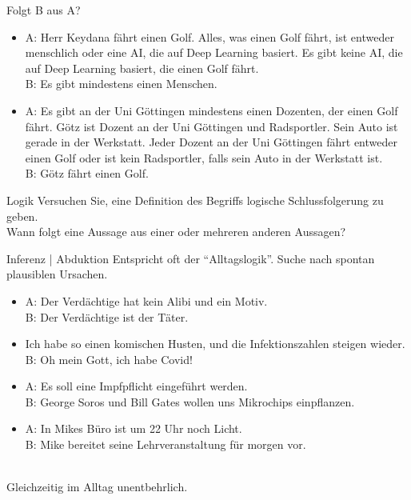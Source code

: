 \begin{frame}
  {Folgt B aus A?} %
  \onslide<+->
  \begin{itemize}[<+->]
    \item A: Herr Keydana fährt einen Golf. Alles, was einen Golf fährt, ist entweder menschlich oder eine AI, die auf Deep Learning basiert. Es gibt keine AI, die auf Deep Learning basiert, die einen Golf fährt.\\
      \alert{B: Es gibt mindestens einen Menschen.}
      \Halbzeile
    \item A: Es gibt an der Uni Göttingen mindestens einen Dozenten, der einen Golf fährt. Götz ist Dozent an der Uni Göttingen und Radsportler. Sein Auto ist gerade in der Werkstatt. Jeder Dozent an der Uni Göttingen fährt entweder einen Golf oder ist kein Radsportler, falls sein Auto in der Werkstatt ist.\\
      \alert{B: Götz fährt einen Golf.}
  \end{itemize}
\end{frame}

\begin{frame}
  {Logik}
  \onslide<+->
  \onslide<+->
  \centering 
  Versuchen Sie, eine Definition des Begriffs \alert{logische Schlussfolgerung} zu geben.\\
  \onslide<+->
  \Zeile
  Wann folgt eine Aussage aus einer oder mehreren anderen Aussagen?
\end{frame}

\begin{frame}
  {Inferenz | Abduktion}
  \onslide<+->
  \onslide<+->
  Entspricht oft der "`Alltagslogik"'. Suche nach \alert{spontan plausiblen Ursachen}.\\
  \Halbzeile
  \begin{itemize}[<+->]
    \item A: Der Verdächtige hat kein Alibi und ein Motiv.\\
      B: Der Verdächtige ist der Täter.
    \item Ich habe so einen komischen Husten, und die Infektionszahlen steigen wieder.\\
      B: Oh mein Gott, ich habe Covid!
    \item A: Es soll eine Impfpflicht eingeführt werden.\\
      B: George Soros und Bill Gates wollen uns Mikrochips einpflanzen.
    \item A: In Mikes Büro ist um 22 Uhr noch Licht.\\
      B: Mike bereitet seine Lehrveranstaltung für morgen vor.
  \end{itemize}
  \onslide<+->
  \centering 
  \Zeile 
  \\
  \alert{Gleichzeitig im Alltag unentbehrlich.}\\
\end{frame}

